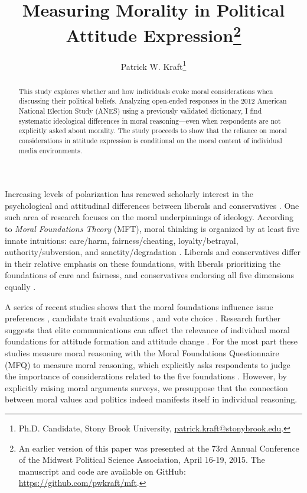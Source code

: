 \documentclass[12pt]{article}
\author{Patrick W. Kraft\footnote{Ph.D. Candidate, Stony Brook University, \href{mailto:patrick.kraft@stonybrook.edu}{patrick.kraft@stonybrook.edu}.
}}
\title{Measuring Morality in Political Attitude Expression\footnote{An earlier version of this paper was presented at the 73rd Annual Conference of the Midwest Political Science Association, April 16-19, 2015. The manuscript and code are available on GitHub: \url{https://github.com/pwkraft/mft}.}}
\begin{document}
\maketitle
\doublespacing
\thispagestyle{empty}

\begin{abstract}
This study explores whether and how individuals evoke moral considerations when discussing their political beliefs. Analyzing open-ended responses in the 2012 American National Election Study (ANES) using a previously validated dictionary, I find systematic ideological differences in moral reasoning---even when respondents are not explicitly asked about morality. The study proceeds to show that the reliance on moral considerations in attitude expression is conditional on the moral content of individual media environments.

\end{abstract}
\newpage
\setcounter{page}{1}

Increasing levels of polarization has renewed scholarly interest in the psychological and attitudinal differences between liberals and conservatives \citep{jost2006end}. One such area of research focuses on the moral underpinnings of ideology. According to \textit{Moral Foundations Theory} (MFT), moral thinking is organized by at least five innate intuitions: care/harm, fairness/cheating, loyalty/betrayal, authority/subversion, and sanctity/degradation \citep{haidt2012righteous,graham2013moral}. Liberals and conservatives differ in their relative emphasis on these foundations, with liberals prioritizing the foundations of care and fairness, and conservatives endorsing all five dimensions equally \citep{graham2009liberals}.


A series of recent studies shows that the moral foundations influence issue preferences \citep{kertzer2014moral}, candidate trait evaluations \citep{clifford2014linking}, and vote choice \citep{iyer2010beyond}. Research further suggests that elite communications can affect the relevance of individual moral foundations for attitude formation and attitude change \citep[e.g.][]{clifford2015concerns,feinberg2013moral}. For the most part these studies measure moral reasoning with the Moral Foundations Questionnaire (MFQ) to measure moral reasoning, which explicitly asks respondents to judge the importance of considerations related to the five foundations \citep[e.g.][]{graham2011mapping}. However, by explicitly raising moral arguments surveys, we presuppose that the connection between moral values and politics indeed manifests itself in individual reasoning.
\end{document}
